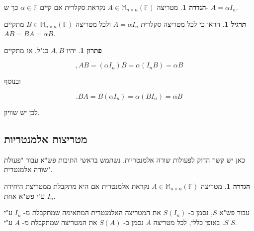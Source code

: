 \documentclass[12pt]{report}
\theoremstyle{plain}
\theoremstyle{definition}
\newtheorem{definition}[theorem]{הגדרה}
\newtheorem{exercise}{תרגיל}[chapter]
\newtheorem*{solution}{פתרון}
\newcommand{\F}{\mathbb{F}}
\newcommand{\M}{\mathbb{M}}
\newcommand{\0}{\mathbf{0}}
\begin{document}
\begin{definition}
מטריצה 
$A\in\M_{n\times n}(\F)$
נקראת סקלרית אם קיים
$\alpha\in\F$
כך ש-
$A=\alpha I_n$.
\end{definition}

\begin{exercise}
הראו כי לכל מטריצה סקלרית
$A=\alpha I_n$
ולכל מטריצה
$B\in\M_{n\times n}(\F)$
מתקיים
$AB=BA=\alpha B$.
\end{exercise}

\begin{solution}
יהיו 
$A,B$
כנ"ל. אז מתקיים

$$
,AB=(\alpha I_n)B=\alpha(I_nB)=\alpha B
$$

ובנוסף

$$
.BA=B(\alpha I_n)=\alpha(BI_n)=\alpha B
$$

לכן יש שוויון.

\end{solution}

\subsection{מטריצות אלמנטריות}
כאן יש קשר הדוק לפעולות שורה אלמנטריות. נשתמש בראשי התיבות פש"א עבור "פעולת שורה אלמנטרית".

\begin{definition}
מטריצה
$A\in\M_{n\times n}(\F)$
נקראת אלמנטרית אם היא מתקבלת ממטריצת היחידה
$I_n$
ע"י פש"א אחת.

עבור פש"א 
$S$,
נסמן ב-
$S(I_n)$
את המטריצה האלמנטרית המתאימה שמתקבלת מ-
$I_n$
ע"י 
$S$.
באופן כללי, לכל מטריצה
$A$
נסמן ב-
$S(A)$
את המטריצה שמתקבלת מ-
$A$
ע"י
$S$.
\end{definition}
\end{document}
